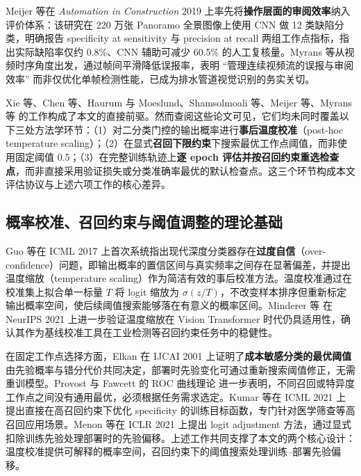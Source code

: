 \documentclass[UTF8,openany,12pt]{ctexbook}
\begin{document}
Meijer 等在 \emph{Automation in Construction} 2019 上率先将\textbf{操作层面的审阅效率}纳入评价体系：该研究在 220 万张 Panoramo 全景图像上使用 CNN 做 12 类缺陷分类，明确报告 specificity at sensitivity 与 precision at recall 两组工作点指标，指出实际缺陷率仅约 0.8\%、CNN 辅助可减少 60.5\% 的人工复核量\cite{meijer2019defect}。Myrans 等从视频时序角度出发，通过帧间平滑降低误报率，表明 ``管理连续视频流的误报与审阅效率'' 而非仅优化单帧检测性能，已成为排水管道视觉识别的务实关切\cite{myrans2019automated}。

Xie 等\cite{xie2019hierarchical}、Chen 等\cite{chen2018intelligent}、Haurum 与 Moeslund\cite{haurum2021sewerml}、Shamsolmoali 等\cite{shamsolmoali2025twostage}、Meijer 等\cite{meijer2019defect}、Myrans 等\cite{myrans2019automated} 的工作构成了本文的直接前驱。然而查阅这些论文可见，它们均未同时覆盖以下三处方法学环节：（1）对二分类门控的输出概率进行\textbf{事后温度校准}（post-hoc temperature scaling）\cite{guo2017calibration}；（2）在显式\textbf{召回下限约束}下搜索最优工作点阈值\cite{kumar2021constrained}，而非使用固定阈值 0.5；（3）在完整训练轨迹上\textbf{逐 epoch 评估并按召回约束重选检查点}，而非直接采用验证损失或分类准确率最优的默认检查点。这三个环节构成本文评估协议与上述六项工作的核心差异。

\subsection{概率校准、召回约束与阈值调整的理论基础}
Guo 等在 ICML 2017 上首次系统指出现代深度分类器存在\textbf{过度自信}（over-confidence）问题，即输出概率的置信区间与真实频率之间存在显著偏差，并提出温度缩放（temperature scaling）作为简洁有效的事后校准方法\cite{guo2017calibration}。温度校准通过在校准集上拟合单一标量 $T$ 将 logit 缩放为 $\sigma(z/T)$，不改变样本排序但重新标定输出概率空间，使后续阈值搜索能够落在有意义的概率区间。Minderer 等\cite{minderer2021calibration} 在 NeurIPS 2021 上进一步验证温度缩放在 Vision Transformer 时代仍具适用性，确认其作为基线校准工具在工业检测等召回约束任务中的稳健性。

在固定工作点选择方面，Elkan 在 IJCAI 2001 上证明了\textbf{成本敏感分类的最优阈值}由先验概率与错分代价共同决定，部署时先验变化可通过重新搜索阈值修正，无需重训模型\cite{elkan2001foundations}。Provost 与 Fawcett 的 ROC 曲线理论\cite{provost2001robust} 进一步表明，不同召回或特异度工作点之间没有通用最优，必须根据任务需求选定。Kumar 等在 ICML 2021 上提出直接在高召回约束下优化 specificity 的训练目标函数，专门针对医学筛查等高召回应用场景\cite{kumar2021constrained}。Menon 等在 ICLR 2021 上提出 logit adjustment 方法，通过显式扣除训练先验处理部署时的先验偏移\cite{menon2021longtail}。上述工作共同支撑了本文的两个核心设计：温度校准提供可解释的概率空间，召回约束下的阈值搜索处理训练--部署先验偏移。
\end{document}
